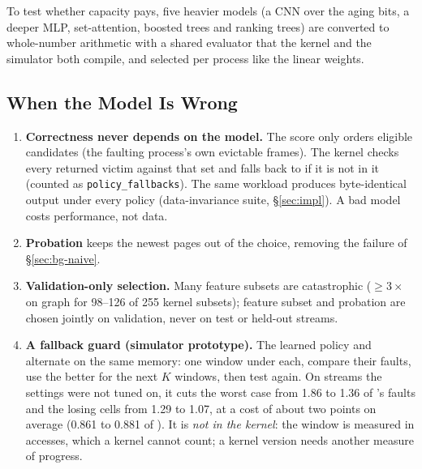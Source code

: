  To test whether capacity pays, five
heavier models (a CNN over the aging bits, a deeper MLP, set-attention, boosted trees and
ranking trees) are converted to whole-number arithmetic with a shared evaluator that the
kernel and the simulator both compile, and selected per process like the linear weights.

\subsection{When the Model Is Wrong}
\label{sec:design-wrong}

\begin{enumerate}
\item \textbf{Correctness never depends on the model.} The score only orders eligible
  candidates (the faulting process's own evictable frames). The kernel checks every
  returned victim against that set and falls back to \clock if it is not in it (counted
  as \texttt{policy\_fallbacks}). The same workload produces byte-identical output under
  every policy (data-invariance suite, \S\ref{sec:impl}). A bad model costs
  performance, not data. 
\item \textbf{Probation} keeps the newest pages out of the choice, removing the failure
  of \S\ref{sec:bg-naive}.
\item \textbf{Validation-only selection.} Many feature subsets are catastrophic
  ($\geq3\times$ \clock on graph for 98--126 of 255 kernel subsets); feature subset and
  probation are chosen jointly on validation, never on test or held-out streams.
\item \textbf{A fallback guard (simulator prototype).} The learned policy and \clock
  alternate on the same memory: one window under each, compare their faults, use the
  better for the next $K$ windows, then test again. On streams the settings were not
  tuned on, it cuts the worst case from 1.86 to 1.36 of \clock's faults and the losing
  cells from 1.29 to 1.07, at a cost of about two points on average (0.861 to 0.881 of
  \clock). It is \emph{not in the kernel}: the window is measured in accesses, which a
  kernel cannot count; a kernel version needs another measure of progress.
\end{enumerate}


